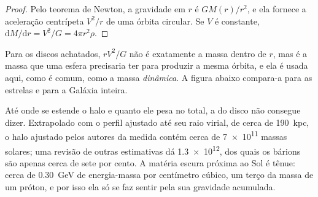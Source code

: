 \begin{proof}
Pelo teorema de Newton, a gravidade em $r$ é $GM(r)/r^2$, e ela fornece a
aceleração centrípeta $V^2/r$ de uma órbita circular. Se $V$ é constante,
$\mathrm{d}M/\mathrm{d}r = V^2/G = 4\pi r^2\rho$.
\end{proof}

Para os discos achatados, $rV^2/G$ não é exatamente a massa dentro de $r$, mas
é a massa que uma esfera precisaria ter para produzir a mesma órbita, e ela é
usada aqui, como é comum, como a massa \emph{dinâmica}. A figura abaixo
compara-a para as estrelas e para a Galáxia inteira.

\begin{omfigure}
\centering
{}
\par{}\label{fig:b3:milky-way-galaxies:mass}
\end{omfigure}

Até onde se estende o halo e quanto ele pesa no total, a  do disco não consegue dizer. Extrapolado com o perfil ajustado até
seu raio virial, de cerca de \qty{190}{kpc}, o halo ajustado pelos autores da
medida contém cerca de \num{7e11} massas solares; uma revisão de outras
estimativas dá \num{1.3e12}, dos quais os bárions são apenas cerca de
sete por cento. A matéria escura próxima ao Sol é tênue: cerca de
\qty{0.30}{GeV} de energia-massa por centímetro cúbico, um terço da massa
de um próton, e por isso ela só se faz sentir pela sua gravidade acumulada.

